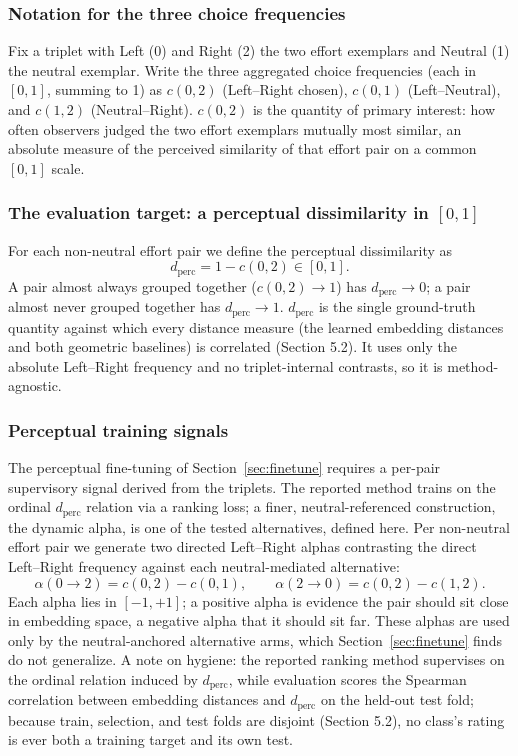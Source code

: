 \documentclass[letterpaper]{article} %
\begin{document}
\subsubsection{Notation for the three choice frequencies}
Fix a triplet with {Left (0)} and {Right (2)} the two effort exemplars and
{Neutral (1)} the neutral exemplar. Write the three aggregated choice frequencies (each in
$[0,1]$, summing to 1) as $c(0,2)$ (Left--Right chosen), $c(0,1)$ (Left--Neutral), and $c(1,2)$
(Neutral--Right). $c(0,2)$ is the quantity of primary interest: how often observers judged the
two effort exemplars {mutually most similar}, an absolute measure of the perceived
similarity of that effort pair on a common $[0,1]$ scale.

\subsubsection{The evaluation target: a perceptual dissimilarity in $[0,1]$}
For each non-neutral effort pair we define the perceptual {dissimilarity} as
\[
    d_{\text{perc}} = 1 - c(0,2) \in [0,1].
\]
A pair almost always grouped together ($c(0,2)\to 1$) has $d_{\text{perc}}\to 0$; a pair almost
never grouped together has $d_{\text{perc}}\to 1$. {$d_{\text{perc}}$ is the single
ground-truth quantity against which every distance measure (the learned embedding distances and
both geometric baselines) is correlated} (Section 5.2). It uses only the absolute Left--Right
frequency and no triplet-internal contrasts, so it is method-agnostic.

\subsubsection{Perceptual training signals}
The perceptual fine-tuning of Section~\ref{sec:finetune} requires a per-pair supervisory signal derived from the
triplets. The {reported method trains on the ordinal $d_{\text{perc}}$ relation} via a
ranking loss; a finer, neutral-referenced construction, the {dynamic alpha}, is one of
the tested alternatives, defined here. Per non-neutral effort pair we generate two directed
Left--Right alphas contrasting the direct Left--Right frequency against each neutral-mediated
alternative:
\[
    \alpha(0\!\to\!2) = c(0,2) - c(0,1), \qquad
    \alpha(2\!\to\!0) = c(0,2) - c(1,2).
\]
Each alpha lies in $[-1,+1]$; a positive alpha is evidence the pair should sit {close} in
embedding space, a negative alpha that it should sit {far}. These alphas are used only by
the neutral-anchored {alternative} arms, which Section~\ref{sec:finetune} finds do not generalize. A note
on hygiene: the reported ranking method supervises on the {ordinal relation} induced by
$d_{\text{perc}}$, while evaluation scores the Spearman correlation between embedding distances
and $d_{\text{perc}}$ on the held-out test fold; because train, selection, and test folds are
disjoint (Section 5.2), no class's rating is ever both a training target and its own test.
\end{document}

